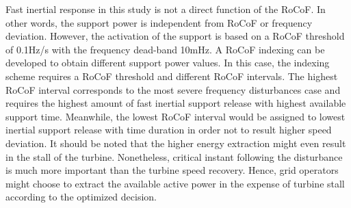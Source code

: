 Fast inertial response in this study is not a direct function of the RoCoF. In other words, the support power is independent from RoCoF or frequency deviation. However, the activation of the support is based on a RoCoF threshold of 0.1Hz/s with the frequency dead-band 10mHz. A RoCoF indexing can be developed to obtain different support power values. In this case, the indexing scheme requires a RoCoF threshold and different RoCoF intervals. The highest RoCoF interval corresponds to the most severe frequency disturbances case and requires the highest amount of fast inertial support release with highest available support time. Meanwhile, the lowest RoCoF interval would be assigned to lowest inertial support release with time duration in order not to result higher speed deviation. It should be noted that the higher energy extraction might even result in the stall of the turbine. Nonetheless, critical instant following the disturbance is much more important than the turbine speed recovery. Hence, grid operators might choose to extract the available active power in the expense of turbine stall according to the optimized decision.
